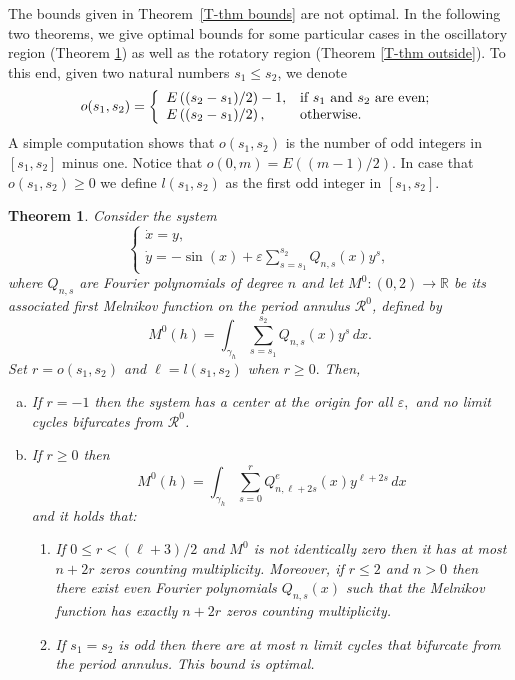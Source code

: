\documentclass[12pt,psamsfonts]{amsart}
\newtheorem{thmx}{Theorem}
\begin{document}
\smallbreak

The bounds given in Theorem~\ref{T-thm bounds} are not optimal. In the following two
theorems, we give optimal bounds for some particular cases in
the oscillatory region (Theorem \ref{T-thm inside}) as well as the
rotatory region (Theorem \ref{T-thm outside}). To this end, given
two natural numbers $s_1\le s_2$, we denote
$$o(s_1,s_2)=\left\{
    \begin{array}{ll}
        E\left({(s_2-s_1)}/{2}\right)-1, & \hbox{if $s_1$ and $s_2$ are even;} \\
        E\left({(s_2-s_1)}/{2}\right), & \hbox{otherwise.}
    \end{array}
                    \right.$$
A simple computation
 shows that $o(s_1,s_2)$ is the number of odd integers in $[s_1,
s_2]$ minus one.  Notice that $o(0,m)=E((m-1)/2).$ In case that $o(s_1,s_2)\ge 0$ we define
$l(s_1,s_2)$ as the first odd integer in $[s_1,s_2]$.

\begin{thmx}\label{T-thm inside} Consider the system
    \begin{equation*}
      \label{E-penduSysGen2}
           {
  \left\{\!
   \begin{array}{l}
    \dot x={y,} \\[2pt] \dot y={-\sin( x)+ {\varepsilon} \sum_{s=s_1}^{s_2}Q_{n,s}(x) y^{s},}
   \end{array}
  \right.
}
     \end{equation*}
where  $Q_{n,s}$ are Fourier polynomials of degree $n$ and let $M^0:(0,2)\longrightarrow {\mathbb{R}}$ be
its associated first Melnikov function on the period annulus $\mathcal {R}^0$, defined by
\begin{equation*}
    M^0(h)  = \int_{{\gamma}_h} \sum_{s=s_1}^{s_2}Q_{n,s}(x) y^{s}\, dx.
\end{equation*}
Set $r=o(s_1,s_2)$ and $\ell= l(s_1,s_2)$ when $r\ge 0.$ Then,
\begin{enumerate}[(a)]

\item If $r=-1$ then the system has a center at the origin for all ${\varepsilon},$
and no limit cycles bifurcates from $\mathcal {R}^0$.

\item If $r\ge0$ then
$$M^0(h)=\int_{\gamma_h}\sum_{s=0}^{r}Q^e_{n,\ell+2s}(x)
y^{\ell+2s}\, dx$$ and it holds that:
\begin{enumerate}

\item [$(b_1)$]  If $0\le r<(\ell+3)/2$ and $M^0$ is not identically zero then
it has at most $n+2r$ zeros counting multiplicity. Moreover, if $r\le 2$ and $n>0$ then there
exist even Fourier polynomials $Q_{n,s}(x)$  such that the Melnikov function has exactly $n+2r$
zeros counting multiplicity.

\item [$(b_2)$] If $s_1=s_2$ is odd then there are at most $n$ limit
cycles that bifurcate from the period annulus. This bound is optimal.

\end{enumerate}
\end{enumerate}
\end{thmx}
\end{document}
